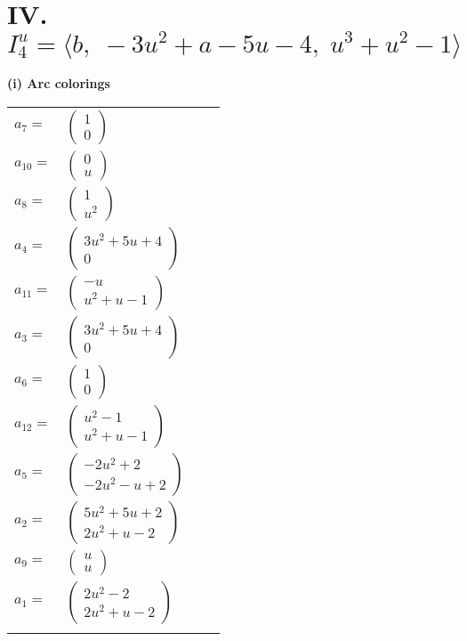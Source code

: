 \documentclass[1p]{elsarticle_modified}
\theoremstyle{definition}
\begin{document}
\centering \section*{IV. $I^u_{4}= \langle b,\;-3 u^2+a-5 u-4,\;u^3+u^2-1 \rangle$}
\flushleft \textbf{(i) Arc colorings}\\
\begin{tabular}{m{7pt} m{180pt} m{7pt} m{180pt} }
\flushright $a_{7}=$&$\begin{pmatrix}1\\0\end{pmatrix}$ \\
\flushright $a_{10}=$&$\begin{pmatrix}0\\u\end{pmatrix}$ \\
\flushright $a_{8}=$&$\begin{pmatrix}1\\u^2\end{pmatrix}$ \\
\flushright $a_{4}=$&$\begin{pmatrix}3 u^2+5 u+4\\0\end{pmatrix}$ \\
\flushright $a_{11}=$&$\begin{pmatrix}- u\\u^2+u-1\end{pmatrix}$ \\
\flushright $a_{3}=$&$\begin{pmatrix}3 u^2+5 u+4\\0\end{pmatrix}$ \\
\flushright $a_{6}=$&$\begin{pmatrix}1\\0\end{pmatrix}$ \\
\flushright $a_{12}=$&$\begin{pmatrix}u^2-1\\u^2+u-1\end{pmatrix}$ \\
\flushright $a_{5}=$&$\begin{pmatrix}-2 u^2+2\\-2 u^2- u+2\end{pmatrix}$ \\
\flushright $a_{2}=$&$\begin{pmatrix}5 u^2+5 u+2\\2 u^2+u-2\end{pmatrix}$ \\
\flushright $a_{9}=$&$\begin{pmatrix}u\\u\end{pmatrix}$ \\
\flushright $a_{1}=$&$\begin{pmatrix}2 u^2-2\\2 u^2+u-2\end{pmatrix}$\\&\end{tabular}
\end{document}
